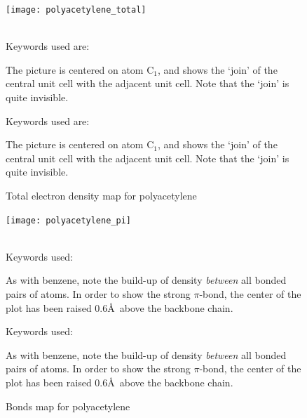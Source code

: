 \begin{figure}
\begin{makeimage}
\end{makeimage}
\begin{center}
\texttt{[image: polyacetylene\_total]} \\~\\
\begin{latexonly}
\parbox{30em}{Keywords used are:


The picture is centered on atom C$_1$, and shows the `join' of the central
unit cell with the adjacent unit cell.  Note that the `join' is quite
invisible.}
\end{latexonly}
\begin{htmlonly}
Keywords used are:


The picture is centered on atom C$_1$, and shows the `join' of the central
unit cell with the adjacent unit cell.  Note that the `join' is quite
invisible.
\end{htmlonly}
\end{center}
\caption{\label{d_solids}Total electron density map for polyacetylene}
\end{figure}

\begin{figure}
\begin{makeimage}
\end{makeimage}
\begin{center}
\texttt{[image: polyacetylene\_pi]} \\~\\
\begin{latexonly}
\parbox{30em}{Keywords used:


As with benzene, note the build-up of density {\em between} all
bonded pairs of atoms.  In order to show the strong $\pi$-bond, the
center of the plot has been raised 0.6\AA\ above the backbone chain.}
\end{latexonly}
\begin{htmlonly}
Keywords used:


As with benzene, note the build-up of density {\em between} all
bonded pairs of atoms.  In order to show the strong $\pi$-bond, the
center of the plot has been raised 0.6\AA\ above the backbone chain.
\end{htmlonly}
\end{center}
\caption{\label{d_solids1}Bonds map for polyacetylene}
\end{figure}

